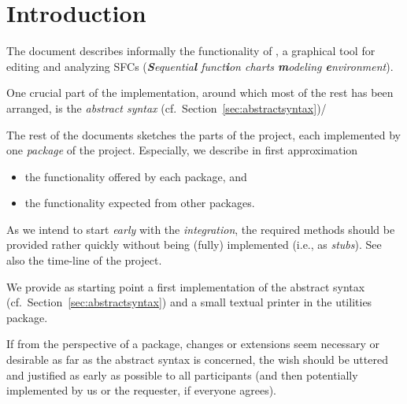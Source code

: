 \section{Introduction}
\label{sec:introduction}

The document describes informally the functionality of \Slime, a graphical
tool for editing and analyzing SFCs (\textit{\textbf{S}equentia\textbf{l}
  funct\textbf{i}on charts \textbf{m}odeling \textbf{e}nvironment}).


One crucial part of the implementation, around which most of the rest has
been arranged, is the \emph{abstract syntax} (cf.\ 
Section~\ref{sec:abstractsyntax})/


The rest of the documents sketches the parts of the project, each
implemented by one \emph{package} of the project. Especially, we describe
in first approximation
\begin{itemize}
\item the functionality offered by each package, and
\item the functionality expected from other packages.
\end{itemize}


As we intend to start \emph{early} with the \emph{integration}, the
required methods should be provided rather quickly without being (fully)
implemented (i.e., as \textit{stubs}). See also the time-line of the
project.

We provide as starting point a first implementation of the abstract syntax
(cf.\ Section~\ref{sec:abstractsyntax}) and a small textual printer in the
utilities package.



If from the perspective of a package, changes or extensions seem necessary
or desirable as far as the abstract syntax is concerned, the wish should be
uttered and justified as early as possible to all participants (and then
potentially implemented by us or the requester, if everyone agrees).

